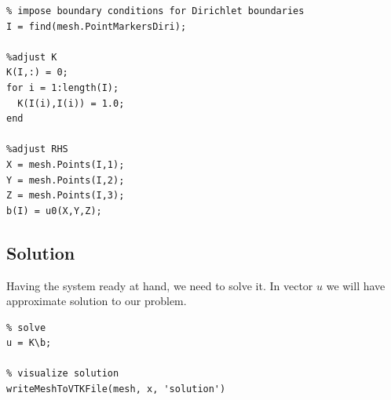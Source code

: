 \documentclass[unicode,11pt,a4paper,oneside,numbers=endperiod,openany]{scrartcl}
\begin{document}
\begin{lstlisting}
% impose boundary conditions for Dirichlet boundaries
I = find(mesh.PointMarkersDiri);

%adjust K
K(I,:) = 0;
for i = 1:length(I);
  K(I(i),I(i)) = 1.0;
end

%adjust RHS
X = mesh.Points(I,1);
Y = mesh.Points(I,2);
Z = mesh.Points(I,3);
b(I) = u0(X,Y,Z);
\end{lstlisting}

\subsection{Solution}
Having the system ready at hand, we need to solve it. In vector $u$ we will have approximate solution to our problem.
\begin{lstlisting}
% solve
u = K\b;

% visualize solution
writeMeshToVTKFile(mesh, x, 'solution')
\end{lstlisting}
\end{document}

